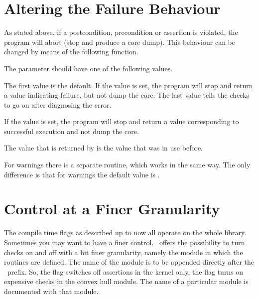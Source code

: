 \section{Altering the Failure Behaviour}

As stated above, if a postcondition, precondition or assertion is
violated, the program will abort (stop and produce a core dump).
This behaviour can be changed by means of the following function.


\ccGlueBegin
{}
\ccGlueEnd

The parameter should have one of the following values.

The first value is the default. 
If the  value is set, the program will stop and return a value 
indicating failure, but not dump the core. 
The last value tells the checks to go on after diagnosing the error.

\begin{ccAdvanced}
If the  value is set, the program will stop and 
return a value corresponding to successful execution and not dump the core. 
\end{ccAdvanced}

The value that is returned by  is the value that was in use before.

For warnings there is a separate routine, which works in the same way.
The only difference is that for warnings the default value is
.

\ccGlueBegin
{}
\ccGlueEnd

\section{Control at a Finer Granularity}

The compile time flags as described up to now all operate on the whole 
library.
Sometimes you may want to have a finer control.
\cgal\ offers the possibility to turn checks on and off with a bit finer
granularity, namely the module in which the routines are defined.
The name of the module is to be appended directly after the \cgal\ prefix.
So, the flag  switches off assertions in 
the kernel only, the flag  turns on
expensive checks in the convex hull module.
The name of a particular module is documented with that module.

